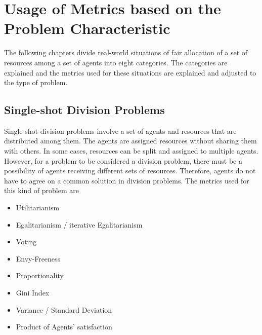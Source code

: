 \documentclass[german, a4paper, 11pt, oneside]{scrbook}
\begin{document}
\chapter{Usage of Metrics based on the Problem Characteristic}
The following chapters divide real-world situations of fair allocation of a set of resources among a set of agents into eight categories. The categories are explained and the metrics used for these situations are explained and adjusted to the type of problem.
\section{Single-shot Division Problems}
Single-shot division problems involve a set of agents and resources that are distributed among them. The agents are assigned resources without sharing them with others. In some cases, resources can be split and assigned to multiple agents. However, for a problem to be considered a division problem, there must be a possibility of agents receiving different sets of resources. Therefore, agents do not have to agree on a common solution in division problems. The metrics used for this kind of problem are
\begin{itemize}
  \item Utilitarianism
  \item Egalitarianism / iterative Egalitarianism
  \item Voting
  \item Envy-Freeness
  \item Proportionality
\item Gini Index
\item Variance / Standard Deviation
\item Product of Agents' satisfaction
\end{itemize}
\end{document}
